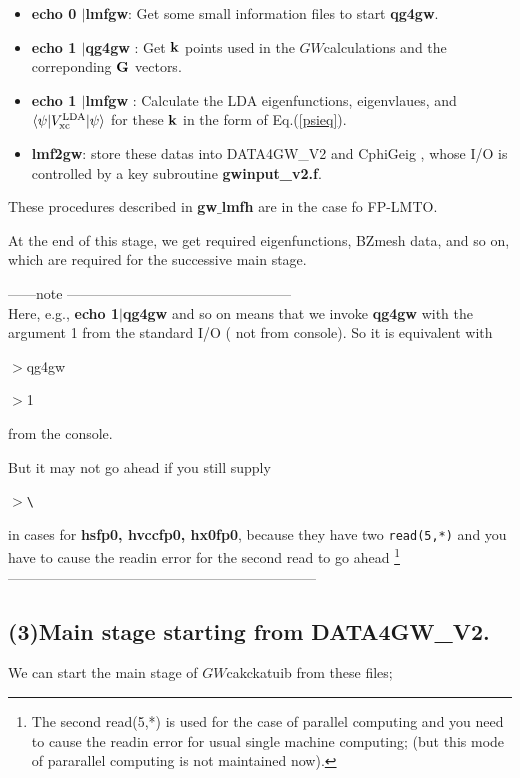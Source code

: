 \documentclass[a4paper,10pt,epsf,fleqn]{article}
\newcommand{\GW}{$GW$}
\begin{document}
\begin{itemize}
\item{\bf echo 0 $|$lmfgw}: 
  Get some small information files to start {\bf qg4gw}.
\item{\bf echo 1 $|$qg4gw }: Get ${\bf k}$ points used
  in the \GW calculations and the correponding ${\bf G}$ vectors.
\item{\bf echo 1 $|$lmfgw} : 
 Calculate the LDA eigenfunctions, eigenvlaues, and
 $\langle \psi | V^{\rm LDA}_{\rm xc}| \psi \rangle$
  for these ${\bf k}$ in the form of Eq.(\ref{psieq}).
\item{\bf lmf2gw}: store these datas into {\sf DATA4GW\_V2} and {\sf CphiGeig} , 
whose I/O is controlled by a key subroutine {\bf gwinput\_v2.f}.
\end{itemize}
\vspace{.3cm}
These procedures described in {\bf gw$\_$lmfh } are in the case fo FP-LMTO.

At the end of this stage, we get required eigenfunctions, BZmesh data, and so on,
which are required for the successive main stage.

{\small
\noindent ------note ------------------------------------------------\\
Here, e.g., {\bf echo 1$|$qg4gw} and so on means that we invoke {\bf qg4gw} with
the argument 1 from the standard I/O ( not from console).
So it is equivalent with

$>$qg4gw 

$>$1 

from the console. 


But it may not go ahead if you still supply

$>$\verb|\| 

in cases for {\bf hsfp0, hvccfp0, hx0fp0}, because they have two {\tt read(5,*)}
and you have to cause the readin error for the second read to go ahead
\footnote{The second read(5,*) is used for the case of parallel computing and
you need to cause the readin error for usual single machine computing;
(but this mode of pararallel computing is not maintained now).}\\
\noindent ------------------------------------------------------------------
}

\subsection{\bf (3)Main stage starting from {\sf DATA4GW\_V2}.}
\label{mainstage}
We can start the main stage of \GW cakckatuib from these files;
\end{document}
